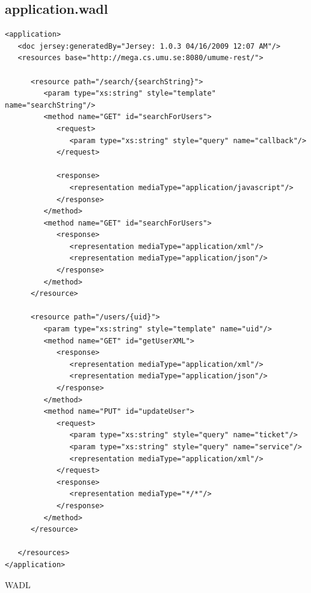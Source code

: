 \documentclass[titlepage, twocolumn, a4paper, 10pt]{article}
\begin{document}
\subsection{application.wadl}\label{app:wadl}
\begin{code}
  \begin{footnotesize}
\begin{verbatim}
<application>
   <doc jersey:generatedBy="Jersey: 1.0.3 04/16/2009 12:07 AM"/>
   <resources base="http://mega.cs.umu.se:8080/umume-rest/">

      <resource path="/search/{searchString}">
         <param type="xs:string" style="template" name="searchString"/>
         <method name="GET" id="searchForUsers">
            <request>
               <param type="xs:string" style="query" name="callback"/>
            </request>

            <response>
               <representation mediaType="application/javascript"/>
            </response>
         </method>
         <method name="GET" id="searchForUsers">
            <response>
               <representation mediaType="application/xml"/>
               <representation mediaType="application/json"/>
            </response>
         </method>
      </resource>

      <resource path="/users/{uid}">
         <param type="xs:string" style="template" name="uid"/>
         <method name="GET" id="getUserXML">
            <response>
               <representation mediaType="application/xml"/>
               <representation mediaType="application/json"/>
            </response>
         </method>
         <method name="PUT" id="updateUser">
            <request>
               <param type="xs:string" style="query" name="ticket"/>
               <param type="xs:string" style="query" name="service"/>
               <representation mediaType="application/xml"/>
            </request>
            <response>
               <representation mediaType="*/*"/>
            </response>
         </method>
      </resource>

   </resources>
</application>
\end{verbatim}
  \end{footnotesize}
  \caption{WADL}\label{code:wadl}
\end{code}
\end{document}
